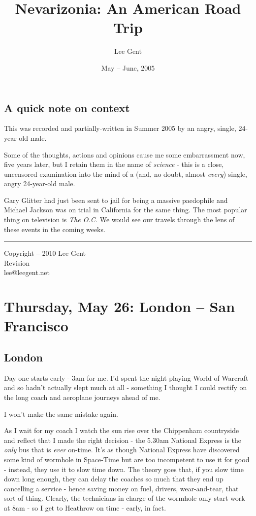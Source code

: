 \documentclass[a5paper,titlepage,11pt]{book}
\title{Nevarizonia: An American Road Trip}
\author{Lee Gent}
\date{May -- June, 2005}
\newcommand{\svn}[1]{\svnsub#1}
\def\svnsub$#1${#1}
\begin{document}
\frontmatter
\maketitle
\pagestyle{plain}

\section*{A quick note on context}
This was recorded and partially-written in Summer 2005 by an angry, single, 24-year old male.

Some of the thoughts, actions and opinions cause me some embarrassment now, five years later, but I retain them in the name of \emph{science} - this is a close, uncensored examination into the mind of a (and, no doubt, almost \emph{every}) single, angry 24-year-old male.

Gary Glitter had just been sent to jail for being a massive paedophile and Michael Jackson was on trial in California for the same thing.  The most popular thing on television is \emph{The O.C.}  We would see our travels through the lens of these events in the coming weeks.

\vfill
\hrule
\begin{center} {\scriptsize Copyright  -- 2010 Lee Gent \\ \svn{$Revision$} \\ lee@leegent.net }  \end{center}

\mainmatter
\chapter[London -- San Francisco]{Thursday, May 26: London -- San Francisco}
\section*{London}
Day one starts early - 3am for me.  I'd spent the night playing World of Warcraft and so hadn't actually slept much at all - something I thought I could rectify on the long coach and aeroplane journeys ahead of me.

I won't make the same mistake again.

As I wait for my coach I watch the sun rise over the Chippenham countryside and reflect that I made the right decision - the 5.30am National Express is the \emph{only} bus that is \emph{ever} on-time.  It's as though National Express have discovered some kind of wormhole in Space-Time but are too incompetent to use it for good - instead, they use it to slow time down.  The theory goes that, if you slow time down long enough, they can delay the coaches so much that they end up cancelling a service - hence saving money on fuel, drivers, wear-and-tear, that sort of thing.  Clearly, the technicians in charge of the wormhole only start work at 8am - so I get to Heathrow on time - early, in fact.
\end{document}
